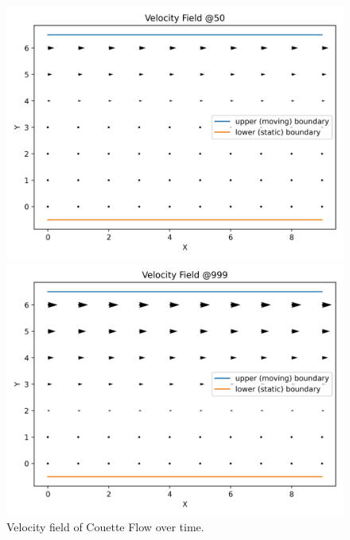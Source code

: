 \begin{center}
    \begin{figure}[h!]
        \begin{minipage}{0.5\textwidth}
            \includegraphics[width=\linewidth]{graphs/CouetteFlow/velocity_field_couette_flow_50}
        \end{minipage}%
        \begin{minipage}{0.5\textwidth}
            \includegraphics[width=\linewidth]{graphs/CouetteFlow/velocity_field_couette_flow_999}
        \end{minipage}
        \caption{Velocity field of Couette Flow over time.}
        \label{fig:cf-velocity-field-over-time}
    \end{figure}
\end{center}

